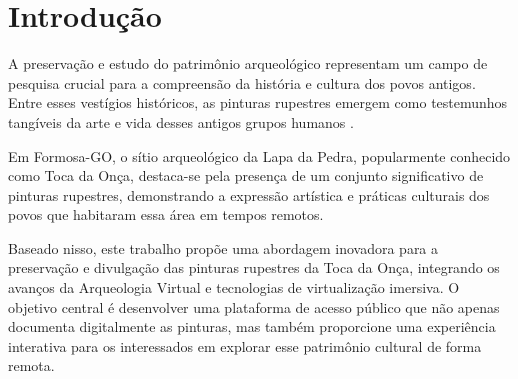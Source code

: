 \chapter{Introdução}\label{Introducao}

A preservação e estudo do patrimônio arqueológico representam um campo de pesquisa crucial para a compreensão da história e cultura dos povos antigos. Entre esses vestígios históricos, as pinturas rupestres emergem como testemunhos tangíveis da arte e vida desses antigos grupos humanos \citep{guimaraes2013}.



Em Formosa-GO, o sítio arqueológico da Lapa da Pedra, popularmente conhecido como Toca da Onça, destaca-se pela presença de um conjunto significativo de pinturas rupestres, demonstrando a expressão artística e práticas culturais dos povos que habitaram essa área em tempos remotos.
    
Baseado nisso, este trabalho propõe uma abordagem inovadora para a preservação e divulgação das pinturas rupestres da Toca da Onça, integrando os avanços da Arqueologia Virtual e tecnologias de virtualização imersiva. O objetivo central é desenvolver uma plataforma de acesso público que não apenas documenta digitalmente as pinturas, mas também proporcione uma experiência interativa para os interessados em explorar esse patrimônio cultural de forma remota.

